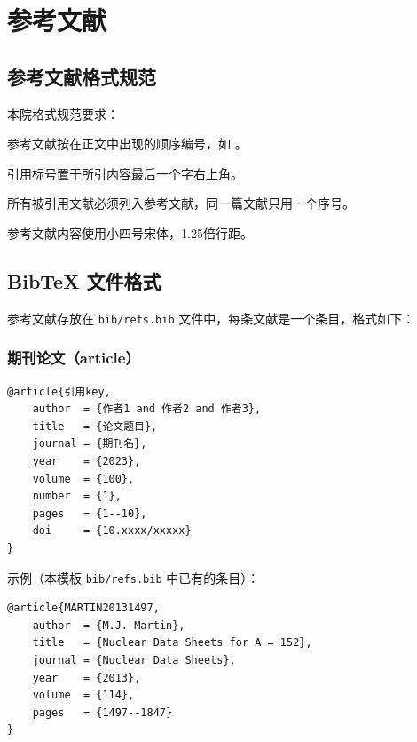 

\chapter{参考文献}\label{chap:references}

\section{参考文献格式规范}

本院格式规范要求：
\begin{compactitem}
    \item 参考文献按在正文中出现的顺序编号，如 \cite{MARTIN20131497}。
    \item 引用标号置于所引内容最后一个字右上角。
    \item 所有被引用文献必须列入参考文献，同一篇文献只用一个序号。
    \item 参考文献内容使用小四号宋体，1.25倍行距。
\end{compactitem}

\section{BibTeX 文件格式}

参考文献存放在 \texttt{bib/refs.bib} 文件中，每条文献是一个条目，格式如下：

\subsection{期刊论文（article）}

\begin{verbatim}
@article{引用key,
    author  = {作者1 and 作者2 and 作者3},
    title   = {论文题目},
    journal = {期刊名},
    year    = {2023},
    volume  = {100},
    number  = {1},
    pages   = {1--10},
    doi     = {10.xxxx/xxxxx}
}
\end{verbatim}

示例（本模板 \texttt{bib/refs.bib} 中已有的条目）：
\begin{verbatim}
@article{MARTIN20131497,
    author  = {M.J. Martin},
    title   = {Nuclear Data Sheets for A = 152},
    journal = {Nuclear Data Sheets},
    year    = {2013},
    volume  = {114},
    pages   = {1497--1847}
}
\end{verbatim}

